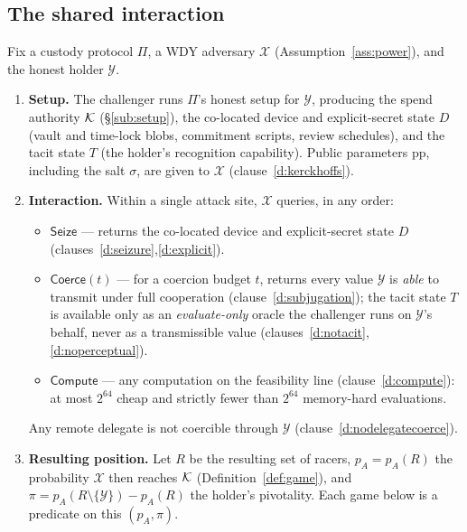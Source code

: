 \subsection{The shared interaction}

\begin{definition}\label{def:wdy-int}
Fix a custody protocol $\Pi$, a WDY adversary $\mathcal{X}$
(Assumption~\ref{ass:power}), and the honest holder $\mathcal{Y}$.
\begin{enumerate}[nosep,leftmargin=1.7em]
  \item \textbf{Setup.} The challenger runs $\Pi$'s honest setup for $\mathcal{Y}$,
  producing the spend authority $\mathcal{K}$ (\S\ref{sub:setup}), the co-located device and explicit-secret state
  $D$ (vault and time-lock blobs, commitment scripts, review schedules), and the
  tacit state $T$ (the holder's recognition capability). Public parameters
  $\mathrm{pp}$, including the salt $\sigma$, are given to $\mathcal{X}$
  (clause~\ref{d:kerckhoffs}).
  \item \textbf{Interaction.} Within a single attack site, $\mathcal{X}$ queries, in
  any order:
  \begin{itemize}[nosep,leftmargin=1.5em]
    \item $\mathsf{Seize}$ --- returns the co-located device and explicit-secret
    state $D$ (clauses~\ref{d:seizure},\ref{d:explicit}).
    \item $\mathsf{Coerce}(t)$ --- for a coercion budget $t$, returns every value
    $\mathcal{Y}$ is \emph{able} to transmit under full cooperation
    (clause~\ref{d:subjugation}); the tacit state $T$ is available only as an
    \emph{evaluate-only} oracle the challenger runs on $\mathcal{Y}$'s behalf, never
    as a transmissible value (clauses~\ref{d:notacit},\ref{d:noperceptual}).
    \item $\mathsf{Compute}$ --- any computation on the feasibility line
    (clause~\ref{d:compute}): at most $2^{64}$ cheap and strictly fewer than
    $2^{64}$ memory-hard evaluations.
  \end{itemize}
  Any remote delegate is not coercible through $\mathcal{Y}$
  (clause~\ref{d:nodelegatecoerce}).
  \item \textbf{Resulting position.} Let $R$ be the resulting set of racers,
  $p_A = p_A(R)$ the probability $\mathcal{X}$ then reaches $\mathcal{K}$
  (Definition~\ref{def:game}), and $\pi = p_A(R\setminus\{\mathcal{Y}\}) - p_A(R)$
  the holder's pivotality. Each game below is a predicate on this $(p_A,\pi)$.
\end{enumerate}
\end{definition}

